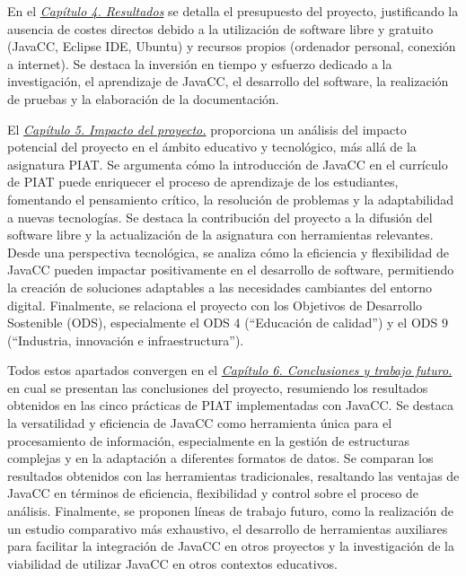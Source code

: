 En el \hyperref[sec:cap4]{\textit{Capítulo 4. Resultados}} se detalla el presupuesto del proyecto, justificando la ausencia de costes directos debido a la utilización de software libre y gratuito (JavaCC, Eclipse IDE, Ubuntu) y recursos propios (ordenador personal, conexión a internet). Se destaca la inversión en tiempo y esfuerzo dedicado a la investigación, el aprendizaje de JavaCC, el desarrollo del software, la realización de pruebas y la elaboración de la documentación.

El \hyperref[sec:cap5]{\textit{Capítulo 5. Impacto del proyecto.}} proporciona un análisis del impacto potencial del proyecto en el ámbito educativo y tecnológico, más allá de la asignatura PIAT. Se argumenta cómo la introducción de JavaCC en el currículo de PIAT puede enriquecer el proceso de aprendizaje de los estudiantes, fomentando el pensamiento crítico, la resolución de problemas y la adaptabilidad a nuevas tecnologías. Se destaca la contribución del proyecto a la difusión del software libre y la actualización de la asignatura con herramientas relevantes. Desde una perspectiva tecnológica, se analiza cómo la eficiencia y flexibilidad de JavaCC pueden impactar positivamente en el desarrollo de software, permitiendo la creación de soluciones adaptables a las necesidades cambiantes del entorno digital. Finalmente, se relaciona el proyecto con los Objetivos de Desarrollo Sostenible (ODS), especialmente el ODS 4 (``Educación de calidad'') y el ODS 9 (``Industria, innovación e infraestructura'').

Todos estos apartados convergen en el \hyperref[sec:cap5]{\textit{Capítulo 6. Conclusiones y trabajo futuro.}} en cual se presentan las conclusiones del proyecto, resumiendo los resultados obtenidos en las cinco prácticas de PIAT implementadas con JavaCC. Se destaca la versatilidad y eficiencia de JavaCC como herramienta única para el procesamiento de información, especialmente en la gestión de estructuras complejas y en la adaptación a diferentes formatos de datos. Se comparan los resultados obtenidos con las herramientas tradicionales, resaltando las ventajas de JavaCC en términos de eficiencia, flexibilidad y control sobre el proceso de análisis. Finalmente, se proponen líneas de trabajo futuro, como la realización de un estudio comparativo más exhaustivo, el desarrollo de herramientas auxiliares para facilitar la integración de JavaCC en otros proyectos y la investigación de la viabilidad de utilizar JavaCC en otros contextos educativos.

